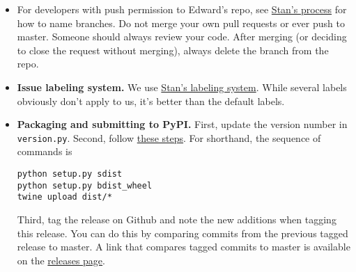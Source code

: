 \begin{itemize}
\item
  For developers with push permission to Edward's repo, see
  \href{https://github.com/stan-dev/stan/wiki/Developer-Process#information-to-include-in-pull-request}{Stan's
  process} for how to name branches. Do not merge your own pull
  requests or ever push to master. Someone should always review your
  code. After merging (or deciding to close the request without
  merging), always delete the branch from the repo.
\item
  \textbf{Issue labeling system.} We use
  \href{https://github.com/stan-dev/stan/issues}{Stan's labeling system}.
  While several labels obviously don't apply to us, it's better than the
  default labels.
\item
  \textbf{Packaging and submitting to PyPI.} First, update the version
  number in \texttt{version.py}. Second, follow
  \href{https://packaging.python.org/en/latest/distributing/\#packaging-your-project}{these
  steps}. For shorthand, the sequence of commands is

\begin{lstlisting}[class=JSON]
python setup.py sdist
python setup.py bdist_wheel
twine upload dist/*
\end{lstlisting}

  Third, tag the release on Github and note the new additions when
  tagging this release. You can do this by comparing commits from the
  previous tagged release to master. A link that compares tagged commits
  to master is available on the
  \href{https://github.com/blei-lab/edward/releases}{releases page}.
\end{itemize}
